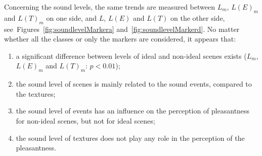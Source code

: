 \documentclass[12pt]{elsarticle}
\newcommand{\cf}{cf.}
\begin{document}

Concerning the sound levels, the same trends are measured between $L_m$, $L(E)_m$ and $L(T)_m$ on one side, and $L$, $L(E)$ and $L(T)$ on the other side, see~Figures~\ref{fig:soundlevelMarkera} and~\ref{fig:soundlevelMarkerd}. No matter whether all the classes or only the markers are considered, it appears that:



\begin{enumerate}
\item a significant difference between levels of ideal and non-ideal scenes exists ($L_m$, $L(E)_m$ and $L(T)_m$: $p<0.01$);
\item the sound level of scenes is mainly related to the sound events, compared to the textures;
\item the sound level of events has an influence on the perception of pleasantness for non-ideal scenes, but not for ideal scenes;
\item the sound level of textures does not play any role in the perception of the pleasantness.
\end{enumerate}

\end{document}
